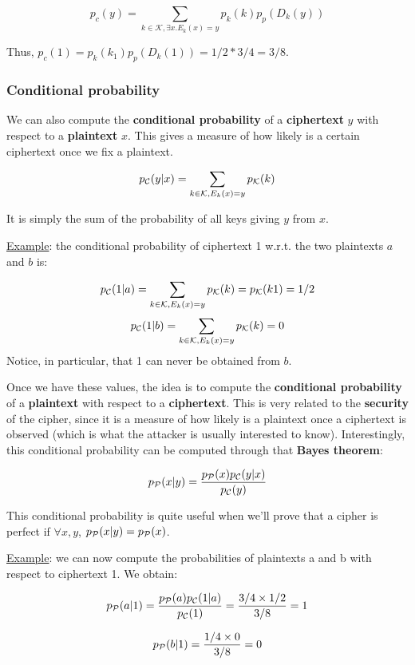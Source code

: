 $$
p_c(y) = \sum_{k \in \mathcal{K}, \exists x . E_k (x) = y} p_{k} (k) p_p(D_k(y))
$$

Thus, $p_c(1) = p_k(k_1) p_p(D_k(1)) = 1/2 * 3/4 = 3/8$.

\subsubsection{Conditional probability}

We can also compute the \textbf{conditional probability} of a \textbf{ciphertext} $y$ with respect to a \textbf{plaintext} $x$. This gives a measure of how likely is a certain ciphertext once we fix a plaintext.

$$p_{\cal C}(y|x) = \displaystyle \sum_{k \in {\cal K}, E_k(x)=y} {p_{\cal K}(k) }$$

It is simply the sum of the probability of all keys giving $y$ from $x$.

\underline{Example}: the conditional probability of ciphertext 1 w.r.t. the two plaintexts $a$ and $b$ is:

$$p_{\cal C}(1|a) = \displaystyle \sum_{k \in {\cal K}, E_k(x)=y} {p_{\cal K}(k) } = p_{\cal K}(k1) = 1/2$$
$$p_{\cal C}(1|b) = \displaystyle \sum_{k \in {\cal K}, E_k(x)=y} {p_{\cal K}(k) } =0$$
Notice, in particular, that 1 can never be obtained from $b$.

Once we have these values, the idea is to compute the \textbf{conditional probability} of a \textbf{plaintext} with respect to a \textbf{ciphertext}. This is very related to the \textbf{security} of the cipher, since it is a measure of how likely is a plaintext once a ciphertext is observed (which is what the attacker is usually interested to know). Interestingly, this conditional probability can be computed through that \textbf{Bayes theorem}:

$$p_{\cal P}(x|y) =\displaystyle \frac{p_{\cal P}(x)p_{\cal C}(y|x)}{p_{\cal C}(y)}$$

This conditional probability is quite useful when we'll prove that a cipher is perfect if $\forall x,y$, $p_{\cal P}(x|y) = p_{\cal P}(x)$.

\underline{Example}: we can now compute the probabilities of plaintexts a and b with respect to ciphertext 1. We obtain:

$$p_{\cal P}(a|1) = \displaystyle \frac{p_{\cal P}(a)p_{\cal C}(1|a)}{p_{\cal C}(1)} = \displaystyle \frac{3/4 \times 1/2}{3/8} = 1$$

$$p_{\cal P}(b|1) = \displaystyle \frac{1/4 \times 0}{3/8} = 0$$

